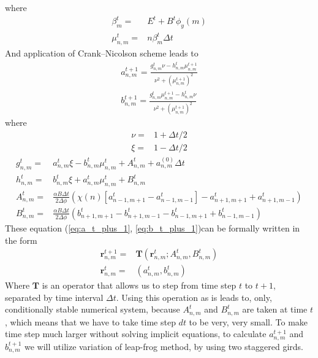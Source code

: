 \documentclass[40pt,letterpaper,physrev]{article}
\begin{document}
	where 
	\begin{align}
	\beta^t_m=&E^t+B^t\phi_y(m) \\
	\mu^t_{n,m}=&n\beta^t_{m}\Delta t
	\end{align}
	And application of Crank–Nicolson scheme leads to
	\begin{align}
	a^{t+1}_{n,m}=\frac{g^t_{n,m}\nu-h^t_{n,m}\mu^{t+1}_{n,m}}{\nu^2+\left(\mu^{t+1}_{n,m}\right)^2}\label{eq:a_t_plus_1}\\
	b^{t+1}_{n,m}=\frac{g^t_{n,m}\mu^{t+1}_{n,m}-h^t_{n,m}\nu}{\nu^2+\left(\mu^{t+1}_{n,m}\right)^2}\label{eq:b_t_plus_1}
	\end{align}
	where 
	\begin{align}
	\nu=&1+\Delta t/2 \\
	\xi=&1-\Delta t/2 
	\end{align}
	\begin{align}
	g^t_{n,m}=&a^t_{n,m}\xi-
		b^t_{n,m}\mu^t_{n,m}+A^t_{n,m}+a^{(0)}_{n,m}\Delta t \\
	h^t_{n,m}=&b^t_{n,m}\xi+a^t_{n,m}\mu^t_{n,m}+
		B^t_{n,m} \\
	A^t_{n,m}=&\frac{\alpha B\Delta t}{2\Delta\phi}(\chi(n)[a^t_{n-1,m+1}-a^t_{n-1,m-1}]-a^t_{n+1,m+1}+a^t_{n+1,m-1}) \\
	B^t_{n,m}=&\frac{\alpha B\Delta t}{2\Delta\phi}(b^t_{n+1,m+1}-b^t_{n+1,m-1}-
		b^t_{n-1,m+1}+b^t_{n-1,m-1})
	\end{align}
	These equation (\ref{eq:a_t_plus_1}, \ref{eq:b_t_plus_1})can be formally written in the form
	\begin{align}
		\mathbf{r}^{t+1}_{n,m}=&\mathbf{T}(\mathbf{r}^t_{n,m};A^t_{n,m},B^t_{n,m}) \label{eq:time_shift} \\
		\mathbf{r}^{t}_{n,m}=&(a^t_{n,m}, b^t_{n,m})
	\end{align}
	Where $\mathbf{T}$ is an operator that allows us to step from time step $t$ to $t+1$, separated by time interval $\Delta t$. Using this operation as is leads to, only, conditionally stable numerical system, because $A^t_{n,m}$ and $B^t_{n,m}$ are taken at time $t$, which means that we have to take time step $dt$ to be very, very small. To make time step much larger without solving implicit equations, to calculate $a^{t+1}_{n,m}$ and $b^{t+1}_{n,m}$ we will utilize variation of leap-frog method, by using two staggered girds.
\end{document}
